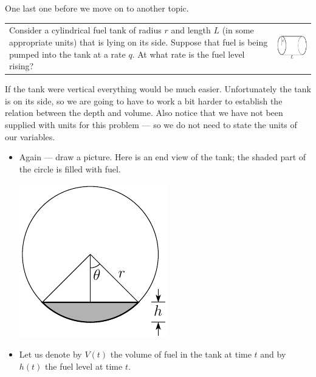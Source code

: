 One last one before we move on to another topic.
\begin{eg}\label{eg:fuel}
\begin{tabular}{m{}m{}}
Consider a cylindrical fuel tank of radius $r$ and length $L$ (in some appropriate units)
that is lying on its side. Suppose that fuel is being pumped into the tank at
a rate $q$. At what rate is the fuel level rising?
%
&
%
\quad\includegraphics{fuel1}
\end{tabular}


\soln If the tank were vertical everything would be much easier. Unfortunately the tank
is on its side, so we are going to have to work a bit harder to establish the relation
between the depth and volume. Also notice that we have not been supplied with units for
this problem --- so we do not need to state the units of our variables.

\begin{itemize}
 \item Again --- draw a picture. Here is an end view of the tank; the shaded part of the
circle  is filled with fuel.

\begin{efig}
\begin{center}
    \includegraphics{fuel2}
\end{center}
\end{efig}

\item Let us denote by $V(t)$ the volume of fuel in the tank at time
$t$ and by $h(t)$ the fuel level at time $t$.


\end{itemize}
\end{eg}
